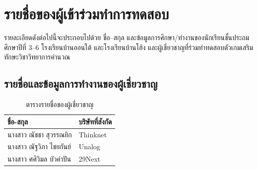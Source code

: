 \chapter{รายชื่อของผู้เข้าร่วมทำการทดสอบ}
รายละเอียดดังต่อไปนี้จะประกอบไปด้วย ชื่อ--สกุล และข้อมูลการศึกษา/ทำงานของนักเรียนชั้นประถมศึกษาปีที่ 3--6 โรงเรียนบ้านออนใต้ และโรงเรียนบ้านโฮ้ง และผู้เชี่ยวชาญที่ร่วมทำทดสอบตัวเกมเสริมทักษะวิชาวิทยาการคำนวณ
\section{รายชื่อและข้อมูลการทำงานของผู้เชี่ยวชาญ}
\begin{table}[h]
    \begin{center}
        \begin{tabular}{ |p{5cm}|p{5cm}| }
            \hline
            ชื่อ-สกุล & บริษัทที่สังกัด\\
            \hline
            นางสาว ณัชชา สุวรรณยิก & Thinknet\\
            \hline
            นางสาว ณัฐวิภา ไชยกันย์ & Unalog\\
            \hline
            นางสาว ศศิวิมล บัวคำปัน & 29Next\\
            \hline
        \end{tabular}
    \end{center}
    \caption[ตารางรายชื่อของผู้เชี่ยวชาญ]{ตารางรายชื่อของผู้เชี่ยวชาญ}
    \label{expertstable}
\end{table}

